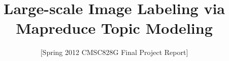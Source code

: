\documentclass{sig-alternate}
\begin{document}
%
\crdata{}

\title{Large-scale Image Labeling via Mapreduce Topic Modeling}
\subtitle{[Spring 2012 CMSC828G Final Project Report]
}
%
%
%
%
%
\end{document}
